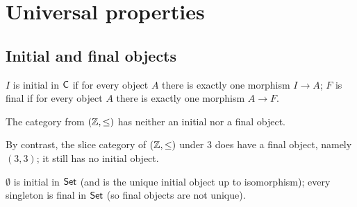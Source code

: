 \section{Universal properties}
\label{sec:prelims:universal-properties}

\subsection{Initial and final objects}
\label{subsec:prelims:initial-and-final-objects}

\begin{definition}
  \label{def:prelims:initial-final}
  \leanok
  $I$ is initial in $\mathsf{C}$ if for every object $A$ there is
  exactly one morphism $I \to A$; $F$ is final if for every object
  $A$ there is exactly one morphism $A \to F$.
\end{definition}

\begin{proposition}
  \label{prop:prelims:no-initial-final-le-int}
  The category from $(\mathbb{Z},\leq)$ has neither an initial nor a final
  object.
\end{proposition}

\begin{proposition}
  \label{prop:prelims:final-slice-le-int}
  By contrast, the slice category of $(\mathbb{Z},\leq)$ under $3$ does have
  a final object, namely $(3,3)$; it still has no initial object.
\end{proposition}

\begin{proposition}
  \label{prop:prelims:initial-final-type-category}
  $\emptyset$ is initial in $\mathsf{Set}$ (and is the unique initial
  object up to isomorphism); every singleton is final in
  $\mathsf{Set}$ (so final objects are not unique).
\end{proposition}

